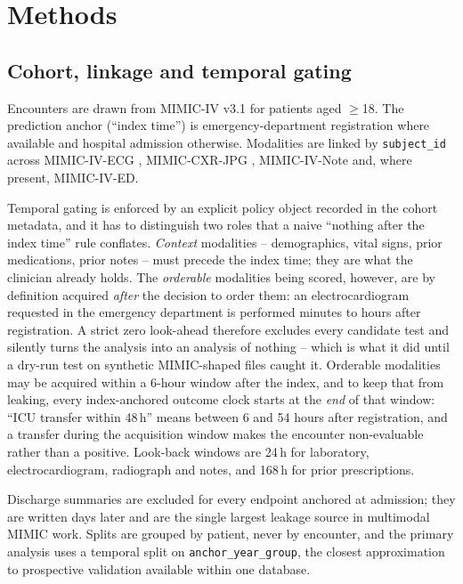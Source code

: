\documentclass[11pt]{article}
\theoremstyle{definition}
\theoremstyle{remark}
\begin{document}
\section{Methods}

\subsection{Cohort, linkage and temporal gating}
\label{sec:cohort}

Encounters are drawn from MIMIC-IV v3.1 \citep{johnson2023mimiciv} for patients
aged $\ge$18. The prediction anchor (``index time'') is emergency-department
registration where available and hospital admission otherwise. Modalities are
linked by \texttt{subject\_id} across MIMIC-IV-ECG \citep{gow2023mimicecg},
MIMIC-CXR-JPG \citep{johnson2019mimiccxr}, MIMIC-IV-Note
\citep{johnson2023mimicnote} and, where present, MIMIC-IV-ED.

Temporal gating is enforced by an explicit policy object recorded in the cohort
metadata, and it has to distinguish two roles that a naive ``nothing after the
index time'' rule conflates. \emph{Context} modalities -- demographics, vital
signs, prior medications, prior notes -- must precede the index time; they are
what the clinician already holds. The \emph{orderable} modalities being scored,
however, are by definition acquired \emph{after} the decision to order them: an
electrocardiogram requested in the emergency department is performed minutes to
hours after registration. A strict zero look-ahead therefore excludes every
candidate test and silently turns the analysis into an analysis of nothing --
which is what it did until a dry-run test on synthetic MIMIC-shaped files caught
it. Orderable modalities may be acquired within a 6-hour window after the index,
and to keep that from leaking, every index-anchored outcome clock starts at the
\emph{end} of that window: ``ICU transfer within 48\,h'' means between 6 and 54
hours after registration, and a transfer during the acquisition window makes the
encounter non-evaluable rather than a positive. Look-back windows are 24\,h for
laboratory, electrocardiogram, radiograph and notes, and 168\,h for prior
prescriptions.

Discharge summaries are excluded for every endpoint anchored at admission; they
are written days later and are the single largest leakage source in multimodal
MIMIC work. Splits are grouped by patient, never by encounter, and the primary
analysis uses a temporal split on \texttt{anchor\_year\_group}, the closest
approximation to prospective validation available within one database.
\end{document}
